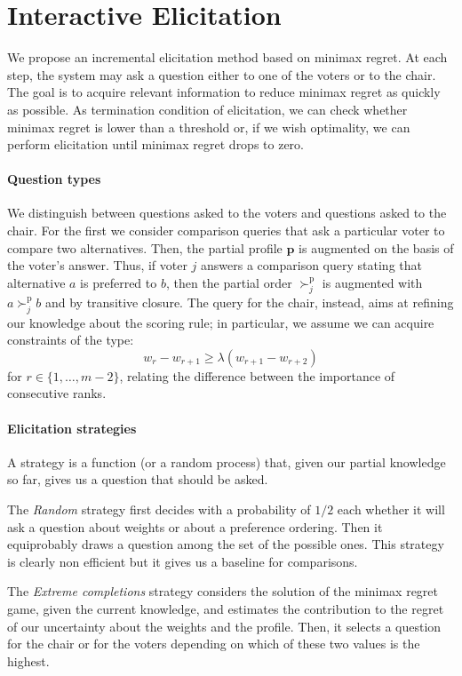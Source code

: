 \documentclass[a4paper,twoside]{article}
\newcommand{\ppref}{\succ^\text{p}}%
\newcommand{\pprofile}{{\bm{p}}}%
\newcommand{\strat}[1]{\emph{#1}}
\begin{document}
\section{Interactive Elicitation} 
\label{sec:elicit}
We propose an incremental elicitation method based on minimax regret.
At each step, the system may ask a question either to one of the voters or to the chair.
The goal is to acquire relevant information to reduce minimax regret as quickly as possible.
As termination condition of elicitation, we can check whether minimax regret is lower than a threshold or, if we wish optimality, we can perform elicitation until minimax regret drops to zero.

\paragraph{Question types}
We distinguish between questions asked to the voters and questions asked to the chair.
For the first we consider comparison queries that ask a particular voter to compare two alternatives. Then, the partial profile $\pprofile$ is augmented on the basis of the voter's answer. Thus, if voter $j$ answers a comparison query stating that alternative $a$ is preferred to $b$, then the partial order $\ppref_j$ is augmented with $a \ppref_j b$ and by transitive closure.
The query for the chair, instead, aims at refining our knowledge about the scoring rule; in particular, we assume we can acquire constraints of the type:
\[ w_{r} - w_{r+1} \geq \lambda (w_{r+1} - w_{r+2}) \] 
for $r \in \{1,\ldots,m-2\}$, relating the difference between the importance of consecutive ranks.

\paragraph{Elicitation strategies}
A strategy is a function (or a random process) that, given our partial knowledge so far, gives us a question that should be asked. 

The \strat{Random} strategy first decides with a probability of $1/2$ each whether it will ask a question about weights or about a preference ordering. Then it equiprobably draws a question among the set of the possible ones. This strategy is clearly non efficient but it gives us a baseline for comparisons.

The \strat{Extreme completions} strategy considers the solution of the minimax regret game, given the current knowledge, and estimates the contribution to the regret of our uncertainty about the weights and the profile. Then, it selects a question for the chair or for the voters depending on which of these two values is the highest.
\end{document}
